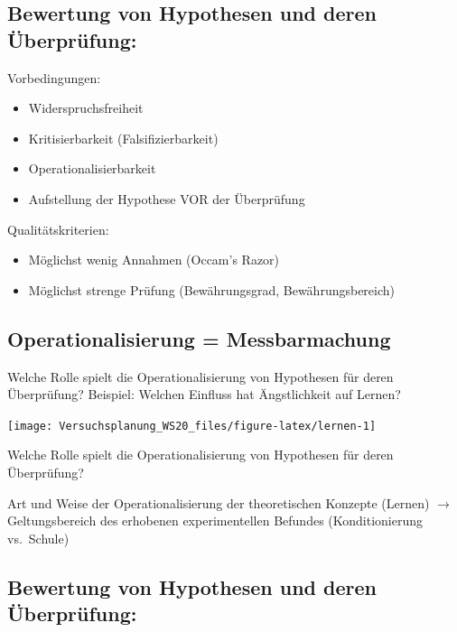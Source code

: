 \documentclass[
]{book}
\providecommand{\tightlist}{%
  \setlength{\itemsep}{0pt}\setlength{\parskip}{0pt}}
\begin{document}
\hypertarget{bewertung-von-hypothesen-und-deren-uxfcberpruxfcfung}{%
\subsection{Bewertung von Hypothesen und deren Überprüfung:}\label{bewertung-von-hypothesen-und-deren-uxfcberpruxfcfung}}

Vorbedingungen:

\begin{itemize}
\tightlist
\item
  Widerspruchsfreiheit
\item
  Kritisierbarkeit (Falsifizierbarkeit)
\item
  Operationalisierbarkeit
\item
  Aufstellung der Hypothese VOR der Überprüfung
\end{itemize}

Qualitätskriterien:

\begin{itemize}
\tightlist
\item
  Möglichst wenig Annahmen (Occam's Razor)
\item
  Möglichst strenge Prüfung (Bewährungsgrad, Bewährungsbereich)
\end{itemize}

\hypertarget{operationalisierung-messbarmachung}{%
\subsection{Operationalisierung = Messbarmachung}\label{operationalisierung-messbarmachung}}

Welche Rolle spielt die Operationalisierung von Hypothesen für deren Überprüfung? Beispiel: Welchen Einfluss hat Ängstlichkeit auf Lernen?

\begin{center}\texttt{[image: Versuchsplanung\_WS20\_files/figure-latex/lernen-1]} \end{center}

Welche Rolle spielt die Operationalisierung von Hypothesen für deren Überprüfung?

Art und Weise der Operationalisierung der theoretischen Konzepte (Lernen) \(\rightarrow\) Geltungsbereich des erhobenen experimentellen Befundes (Konditionierung vs.~Schule)

\hypertarget{bewertung-von-hypothesen-und-deren-uxfcberpruxfcfung-1}{%
\subsection{Bewertung von Hypothesen und deren Überprüfung:}\label{bewertung-von-hypothesen-und-deren-uxfcberpruxfcfung-1}}
\end{document}
